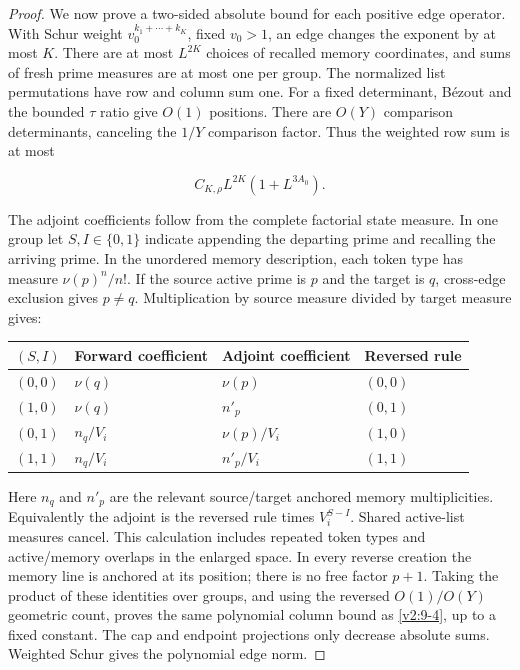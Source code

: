 \documentclass[11pt]{article}
\theoremstyle{definition}
\theoremstyle{remark}
\numberwithin{equation}{section}
\begin{document}
\begin{proof}
We now prove a two-sided absolute bound for each positive edge operator. With Schur weight $v_0^{k_1+\cdots+k_K}$, fixed $v_0>1$, an edge changes the exponent by at most $K$. There are at most $L^{2K}$ choices of recalled memory coordinates, and sums of fresh prime measures are at most one per group. The normalized list permutations have row and column sum one. For a fixed determinant, B\'ezout and the bounded $\tau$ ratio give $O(1)$ positions. There are $O(Y)$ comparison determinants, canceling the $1/Y$ comparison factor. Thus the weighted row sum is at most


\begin{equation}\label{v2:9-4}
C_{K,\rho}L^{2K}(1+L^{3A_0}).
\end{equation}


The adjoint coefficients follow from the complete factorial state measure. In one group let $S,I\in\{0,1\}$ indicate appending the departing prime and recalling the arriving prime. In the unordered memory description, each token type has measure $\nu(p)^n/n!$. If the source active prime is $p$ and the target is $q$, cross-edge exclusion gives $p\ne q$. Multiplication by source measure divided by target measure gives:

\begin{center}\small
\begin{longtable}{@{}>{\raggedright\arraybackslash}p{}>{\raggedright\arraybackslash}p{}>{\raggedright\arraybackslash}p{}>{\raggedright\arraybackslash}p{}@{}}
\toprule
$(S,I)$ & Forward coefficient & Adjoint coefficient & Reversed rule\\
\midrule
$(0,0)$ & $\nu(q)$ & $\nu(p)$ & $(0,0)$\\
$(1,0)$ & $\nu(q)$ & $n'_p$ & $(0,1)$\\
$(0,1)$ & $n_q/V_i$ & $\nu(p)/V_i$ & $(1,0)$\\
$(1,1)$ & $n_q/V_i$ & $n'_p/V_i$ & $(1,1)$\\
\bottomrule
\end{longtable}
\end{center}

Here $n_q$ and $n'_p$ are the relevant source/target anchored memory multiplicities. Equivalently the adjoint is the reversed rule times $V_i^{S-I}$. Shared active-list measures cancel. This calculation includes repeated token types and active/memory overlaps in the enlarged space. In every reverse creation the memory line is anchored at its position; there is no free factor $p+1$. Taking the product of these identities over groups, and using the reversed $O(1)/O(Y)$ geometric count, proves the same polynomial column bound as \eqref{v2:9-4}, up to a fixed constant. The cap and endpoint projections only decrease absolute sums. Weighted Schur gives the polynomial edge norm.


\end{proof}
\end{document}
